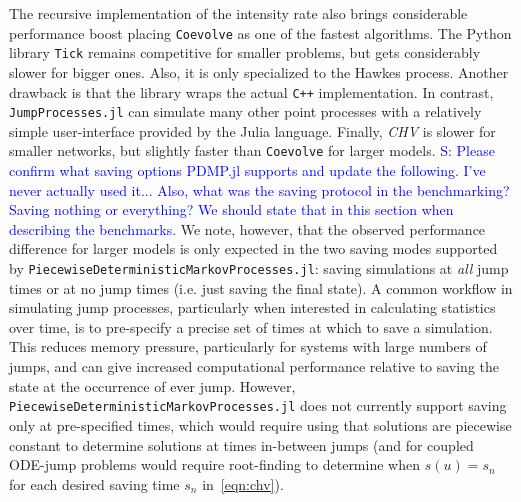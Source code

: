 \documentclass{juliacon}
\newcommand{\comment}[1]{\textcolor{blue}{#1}}
\begin{document}
The recursive implementation of the intensity rate also brings considerable performance boost placing \texttt{Coevolve} as one of the fastest algorithms. The Python library \texttt{Tick} remains competitive for smaller problems, but gets considerably slower for bigger ones. Also, it is only specialized to the Hawkes process. Another drawback is that the library wraps the actual \texttt{C++} implementation. In contrast, \texttt{JumpProcesses.jl} can simulate many other point processes with a relatively simple user-interface provided by the Julia language. Finally, \textit{CHV} is slower for smaller networks, but slightly faster than \texttt{Coevolve} for larger models. \comment{S: Please confirm what saving options PDMP.jl supports and update the following. I've never actually used it... Also, what was the saving protocol in the benchmarking? Saving nothing or everything? We should state that in this section when describing the benchmarks.} We note, however, that the observed performance difference for larger models is only expected in the two saving modes supported by \texttt{PiecewiseDeterministicMarkovProcesses.jl}: saving simulations at \textit{all} jump times or at no jump times (i.e. just saving the final state). A common workflow in simulating jump processes, particularly when interested in calculating statistics over time, is to pre-specify a precise set of times at which to save a simulation. This reduces memory pressure, particularly for systems with large numbers of jumps, and can give increased computational performance relative to saving the state at the occurrence of ever jump. However, \texttt{PiecewiseDeterministicMarkovProcesses.jl} does not currently support saving only at pre-specified times, which would require using that solutions are piecewise constant to determine solutions at times in-between jumps (and for coupled ODE-jump problems would require root-finding to determine when $s(u) = s_n$ for each desired saving time $s_n$ in~\eqref{eqn:chv}).
\end{document}
